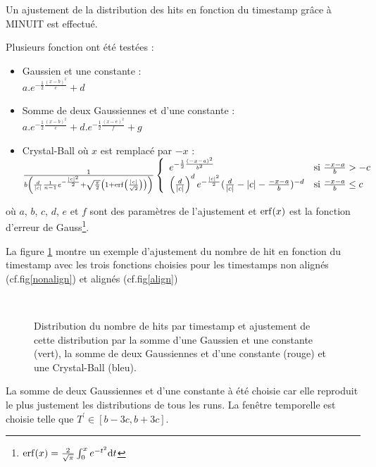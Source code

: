 Un ajustement de la distribution des hits en fonction du timestamp grâce à MINUIT est effectué. 

Plusieurs fonction ont été testées :
\begin{itemize}[label=$\bullet$]
	\item Gaussien et une constante : \\ $a.e^{-\frac{1}{2}\frac{(x-b)^2}{c}}+d$ 
	\item Somme de deux Gaussiennes et d'une constante : \\ $a.e^{-\frac{1}{2}\frac{(x-b)^2}{c}}+d.e^{-\frac{1}{2}\frac{(x-e)^2}{f}}+g$ 
	\item Crystal-Ball où $x$ est remplacé par $-x$ : \\ $\frac{1}{b\left(\frac{d}{|c|}\frac{1}{n-1}e^{-\frac{|c|^2}{2}}+\sqrt{\frac{\pi}{2}}\left(1+\erf\left(\frac{|c|}{\sqrt{2}}\right)\right) \right)}\left\{
	\begin{array}{ll}
	e^{-\frac{1}{2}\frac{(-x-a)^2}{b^2}} & \mbox{si } \frac{-x-a}{b}>-c \\
	\left(\frac{d}{|c|}\right)^d e^{-\frac{|c|^2}{2}} (\frac{d}{|c|}-|c|-\frac{-x-a}{b})^{-d} & \mbox{si }\frac{-x-a}{b}\leq c
	\end{array}
	\right.$
\end{itemize}
où $a$, $b$, $c$, $d$, $e$ et $f$ sont des paramètres de l'ajustement et $\erf(x)$ est la fonction d'erreur de Gauss\footnote{$\erf(x)=\frac{2}{\sqrt{\pi}}\int_0^x e^{-t^2} \dd t$}.

La figure \ref{fitting} montre un exemple d'ajustement du nombre de hit en fonction du timestamp avec les trois fonctions choisies pour les timestamps non alignés (cf.fig\ref{nonalign}) et alignés (cf.fig\ref{align})

\begin{figure}[ht!]
	\centering
	\\
	\caption{Distribution du nombre de hits par timestamp et ajustement de cette distribution par la somme d'une Gaussien et une constante (vert), la somme de deux Gaussiennes et d'une constante (rouge) et une Crystal-Ball (bleu).}
	\label{fitting}
\end{figure}

La somme de deux Gaussiennes et d'une constante à été choisie car elle reproduit le plus justement les distributions de tous les runs. La fenêtre temporelle est choisie telle que $T^{'}\in \left[b-3c,b+3c\right]$.

